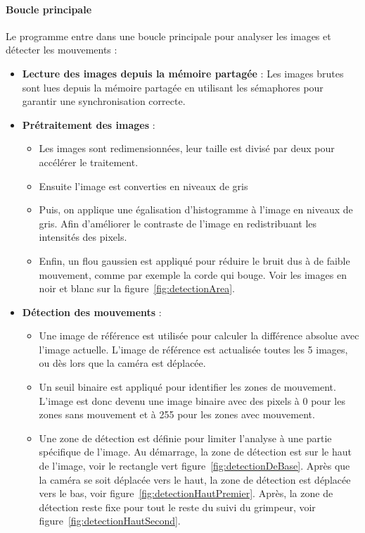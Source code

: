 \documentclass[a4paper, 11pt, french]{article}
\begin{document}
\paragraph{Boucle principale}
Le programme entre dans une boucle principale pour analyser les images et détecter les mouvements :
\begin{itemize}
    \item \textbf{Lecture des images depuis la mémoire partagée} : Les images brutes sont lues depuis la mémoire partagée en utilisant les sémaphores pour garantir une synchronisation correcte.
    \item \textbf{Prétraitement des images} :
    \begin{itemize}
        \item Les images sont redimensionnées, leur taille est divisé par deux pour accélérer le traitement.
        \item Ensuite l'image est converties en niveaux de gris
        \item Puis, on applique une égalisation d'histogramme à l'image en niveaux de gris. Afin d'améliorer le contraste de l'image en redistribuant les intensités des pixels.
        \item Enfin, un flou gaussien est appliqué pour réduire le bruit dus à de faible mouvement, comme par exemple la corde qui bouge. Voir les images en noir et blanc sur la figure~\ref{fig:detectionArea}.
    \end{itemize}
    \item \textbf{Détection des mouvements} :
    \begin{itemize}
        \item Une image de référence est utilisée pour calculer la différence absolue avec l'image actuelle. L'image de référence est actualisée toutes les 5 images, ou dès lors que la caméra est déplacée.
        \item Un seuil binaire est appliqué pour identifier les zones de mouvement. L'image est donc devenu une image binaire avec des pixels à 0 pour les zones sans mouvement et à 255 pour les zones avec mouvement.
        \item Une zone de détection est définie pour limiter l'analyse à une partie spécifique de l'image. Au démarrage, la zone de détection est sur le haut de l'image, voir le rectangle vert figure~\ref{fig:detectionDeBase}. Après que la caméra se soit déplacée vers le haut, la zone de détection est déplacée vers le bas, voir figure~\ref{fig:detectionHautPremier}. Après, la zone de détection reste fixe pour tout le reste du suivi du grimpeur, voir figure~\ref{fig:detectionHautSecond}.
        

\end{itemize}
\end{itemize}
\end{document}

